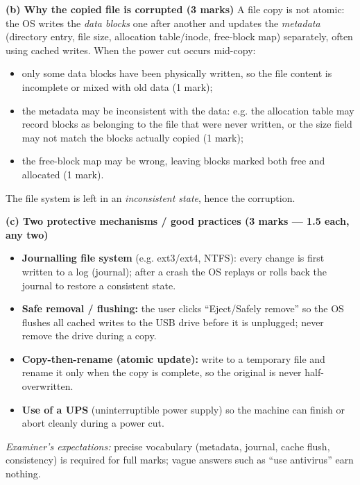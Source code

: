 \documentclass[11pt]{article}
\begin{document}
\begin{corrige}
\textbf{(b) Why the copied file is corrupted (3 marks)}
A file copy is not atomic: the OS writes the \emph{data blocks} one after another and updates the \emph{metadata} (directory entry, file size, allocation table/inode, free-block map) separately, often using cached writes. When the power cut occurs mid-copy:
\begin{itemize}
\item only some data blocks have been physically written, so the file content is incomplete or mixed with old data (1 mark);
\item the metadata may be inconsistent with the data: e.g. the allocation table may record blocks as belonging to the file that were never written, or the size field may not match the blocks actually copied (1 mark);
\item the free-block map may be wrong, leaving blocks marked both free and allocated (1 mark).
\end{itemize}
The file system is left in an \emph{inconsistent state}, hence the corruption.

\textbf{(c) Two protective mechanisms / good practices (3 marks — 1.5 each, any two)}
\begin{itemize}
\item \textbf{Journalling file system} (e.g. ext3/ext4, NTFS): every change is first written to a log (journal); after a crash the OS replays or rolls back the journal to restore a consistent state.
\item \textbf{Safe removal / flushing:} the user clicks ``Eject/Safely remove'' so the OS flushes all cached writes to the USB drive before it is unplugged; never remove the drive during a copy.
\item \textbf{Copy-then-rename (atomic update):} write to a temporary file and rename it only when the copy is complete, so the original is never half-overwritten.
\item \textbf{Use of a UPS} (uninterruptible power supply) so the machine can finish or abort cleanly during a power cut.
\end{itemize}
\emph{Examiner's expectations:} precise vocabulary (metadata, journal, cache flush, consistency) is required for full marks; vague answers such as ``use antivirus'' earn nothing.
\end{corrige}
\end{document}
